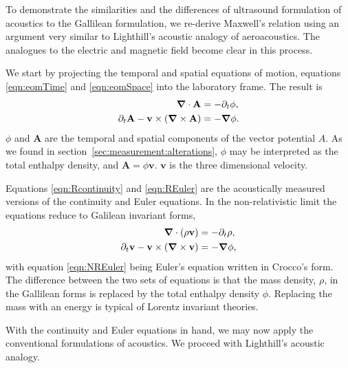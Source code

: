\documentclass[10pt, fleqn,draft,showtrims,oldfontcommands]{article} %
\newcommand{\sub}[1]{\begin{subequations}#1\end{subequations}}
\newcommand{\eqa}[1]{\begin{align}#1\end{align}}
\newcommand{\secref}[1]{section~\ref{sec:#1}}
\newcommand{\eqnref}[1]{\ref{eqn:#1}}
\newcommand{\lr}[1]{\left( #1 \right)}
\renewcommand{\d}{\partial}
\newcommand{\del}{\nabla}
\newcommand{\vdel}{ \mbox{\boldmath $\del$}}
\newcommand{\dt}{{\d_t}}
\newcommand{\g}{\gamma_0}
\newcommand{\vA}{\textbf{A}}
\newcommand{\vv}{\textbf{v}}
\begin{document}
To demonstrate the similarities and the differences of ultrasound formulation of acoustics  to the Gallilean formulation,
we re-derive Maxwell's relation using an argument very similar to Lighthill's acoustic analogy\cite{Lighthill1952} of aeroacoustics.
The analogues to the electric and magnetic field  become clear in this process.

We start  by projecting the temporal and spatial equations of motion, equations \eqnref{eomTime} and \eqnref{eomSpace}
into the laboratory frame.
The result is
\sub{
  \begin{align}
     \vdel \cdot \vA &=  - \dt \phi, \label{eqn:Rcontinuity}\\ %
\dt \vA - \vv \times  \lr{\vdel \times \vA} \label{eqn:REuler}
&= - \vdel \phi.
  \end{align}
}
$\phi$ and $\vA$ are the temporal and spatial components of the vector potential $A$.
As we found in \secref{measurement:alterations}, $\phi$ may be interpreted as the total enthalpy density,
and $\vA = \phi \vv$.
$\vv$ is the three dimensional velocity.

Equations \eqnref{Rcontinuity} and \eqnref{REuler} are the acoustically measured versions of the continuity and Euler equations.
In the non-relativistic limit the equations reduce to Galilean invariant forms, 
\sub{
\begin{align}
  \vdel\cdot\lr{\rho \vv}  &= -\dt \rho, \label{eqn:NRcontinuity}\\
  \dt \vv - \vv\times \lr{\vdel\times \vv} &= - \vdel \phi,\label{eqn:NREuler}
\end{align}
}
with 
equation \eqnref{NREuler} being Euler's equation written in Crocco's form\cite{Howe1998}.
The difference between the two sets of equations is that the mass density, $\rho$, in the Gallilean forms is
replaced by the total enthalpy density $\phi$. 
Replacing the mass with an energy is typical of Lorentz invariant theories.

With the continuity and Euler equations in hand,
we may now apply the conventional formulations of acoustics.
We proceed with Lighthill's acoustic analogy\cite{Lighthill1952, Howe1998}.
\end{document}
